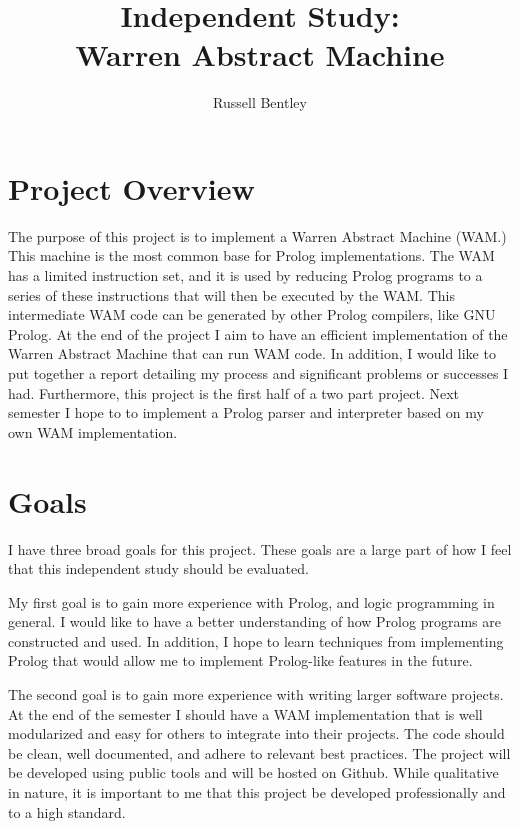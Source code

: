 \documentclass{article}
\begin{document}
\title{Independent Study: \\ Warren Abstract Machine}
\author{Russell Bentley}
\maketitle
\tableofcontents

\section{Project Overview}
The purpose of this project is to implement a Warren Abstract Machine (WAM.) This machine is the most common base for Prolog implementations. The WAM has a limited instruction set, and it is used by reducing Prolog programs to a series of these instructions that will then be executed by the WAM. This intermediate WAM code can be generated by other Prolog compilers, like GNU Prolog. At the end of the project I aim to have an efficient implementation of the Warren Abstract Machine that can run WAM code. In addition, I would like to put together a report detailing my process and significant problems or successes I had. Furthermore, this project is the first half of a two part project. Next semester I hope to to implement a Prolog parser and interpreter based on my own WAM implementation.

\section{Goals}
I have three broad goals for this project. These goals are a large part of how I feel that this independent study 
should be evaluated. 

My first goal is to gain more experience with Prolog, and logic programming in general. I would like to have a better understanding of how Prolog programs are constructed and used. In addition, I hope to learn techniques from implementing Prolog that would allow me to implement Prolog-like features in the future. 

The second goal is to gain more experience with writing larger software projects. At the end of the semester I should have a WAM implementation that is well modularized and easy for others to integrate into their projects. The code should be clean, well documented, and adhere to relevant best practices. The project will be developed using public tools and will be hosted on Github. While qualitative in nature, it is important to me that this project be developed professionally and to a high standard.
\end{document}
